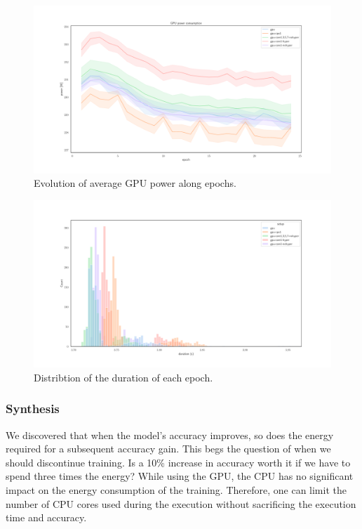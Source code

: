 \begin{figure}
    \centering
    \includegraphics[width=\linewidth]{imgs/power_gpu_baedonepoche.pdf}
    \caption{Evolution of average GPU power along epochs.}
    \label{fig:ephoch_power}
\end{figure}


\begin{figure}
    \centering
    \includegraphics[width=\linewidth]{imgs/epoch_duration.pdf}
    \caption{Distribtion of the duration of each epoch.}
    \label{fig:epoch_duration}
\end{figure}
\subsubsection{Synthesis}
We discovered that when the model's accuracy improves, so does the energy required for a subsequent accuracy gain.
This begs the question of when we should discontinue training.
Is a 10\% increase in accuracy worth it if we have to spend three times the energy?
While using the GPU, the CPU has no significant impact on the energy consumption of the training. Therefore, one can limit the number of CPU cores used during the execution without sacrificing the execution time and accuracy.



